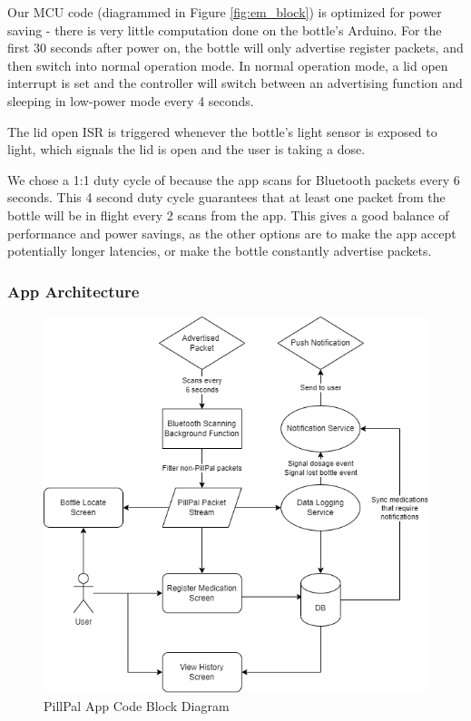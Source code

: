 \documentclass[sigconf]{acmart}
\begin{document}
Our MCU code (diagrammed in Figure \ref{fig:em_block}) is  optimized for power saving - there is very little computation done on the bottle's Arduino. For the first 30 seconds after power on, the bottle will only advertise register packets, and then switch into normal operation mode. In normal operation mode, a lid open interrupt is set and the controller will switch between an advertising function and sleeping in low-power mode every 4 seconds.

The lid open ISR is triggered whenever the bottle's light sensor is exposed to light, which signals the lid is open and the user is taking a dose.

We chose a 1:1 duty cycle of because the app scans for Bluetooth packets every 6 seconds. This 4 second duty cycle guarantees that at least one packet from the bottle will be in flight every 2 scans from the app. This gives a good balance of performance and power savings, as the other options are to make the app accept potentially longer latencies, or make the bottle constantly advertise packets.

\subsubsection{App Architecture}
\label{sec:software_arch}
\begin{figure}[h]
  \centering
  \includegraphics[width=\linewidth]{images/app_block.png}
  \caption{PillPal App Code Block Diagram}
  \label{fig:sw_block}
\end{figure}
\end{document}
